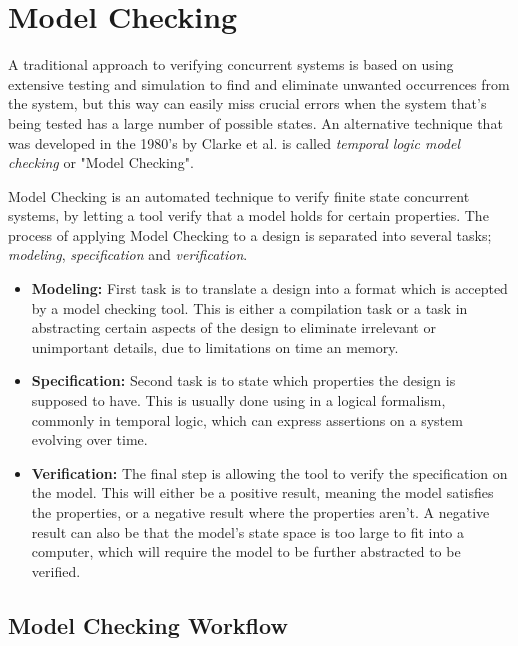 \section{Model Checking}

A traditional approach to verifying concurrent systems is based on using extensive testing and simulation to find and eliminate unwanted occurrences from the system, but this way can easily miss crucial errors when the system that's being tested has a large number of possible states\cite{clarke1999model}. An alternative technique that was developed in the 1980's by Clarke et al. is called \textit{temporal logic model checking} or "Model Checking".

Model Checking is an automated technique to verify finite state concurrent systems, by letting a tool verify that a model holds for certain properties. The process of applying Model Checking to a design is separated into several tasks; \textit{modeling}, \textit{specification} and \textit{verification}. \\

\begin{itemize}
\item[] \textbf{Modeling:} First task is to translate a design into a format which is accepted by a model checking tool. This is either a compilation task or a task in abstracting certain aspects of the design to eliminate irrelevant or unimportant details, due to limitations on time an memory. \\
\item[] \textbf{Specification:} Second task is to state which properties the design is supposed to have. This is usually done using in a logical formalism, commonly in temporal logic, which can express assertions on a system evolving over time. \\
\item[] \textbf{Verification:} The final step is allowing the tool to verify the specification on the model. This will either be a positive result, meaning the model satisfies the properties, or a negative result where the properties aren't. A negative result can also be that the model's state space is too large to fit into a computer, which will require the model to be further abstracted to be verified.
\end{itemize}


\subsection{Model Checking Workflow}

